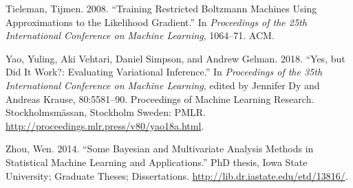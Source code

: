 \documentclass[]{article}
\theoremstyle{definition}
\begin{document}
\leavevmode\hypertarget{ref-tieleman2008training}{}%
Tieleman, Tijmen. 2008. ``Training Restricted Boltzmann Machines Using
Approximations to the Likelihood Gradient.'' In \emph{Proceedings of the
25th International Conference on Machine Learning}, 1064--71. ACM.

\leavevmode\hypertarget{ref-pmlr-v80-yao18a}{}%
Yao, Yuling, Aki Vehtari, Daniel Simpson, and Andrew Gelman. 2018.
``Yes, but Did It Work?: Evaluating Variational Inference.'' In
\emph{Proceedings of the 35th International Conference on Machine
Learning}, edited by Jennifer Dy and Andreas Krause, 80:5581--90.
Proceedings of Machine Learning Research. Stockholmsmässan, Stockholm
Sweden: PMLR. \url{http://proceedings.mlr.press/v80/yao18a.html}.

\leavevmode\hypertarget{ref-zhou2014some}{}%
Zhou, Wen. 2014. ``Some Bayesian and Multivariate Analysis Methods in
Statistical Machine Learning and Applications.'' PhD thesis, Iowa State
University; Graduate Theses; Dissertations.
\url{http://lib.dr.iastate.edu/etd/13816/}.
\end{document}
